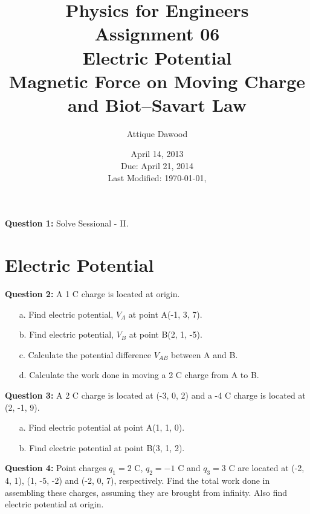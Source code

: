 \documentclass[12pt,a4paper]{article}
\title{\vspace{-3cm}Physics for Engineers\\Assignment 06\\Electric Potential\\ Magnetic Force on Moving Charge and Biot--Savart Law}
\author{Attique Dawood}
\date{April 14, 2013\\Due: April 21, 2014\\[0.2cm] Last Modified: \today, \currenttime}
\begin{document}
\maketitle
\noindent\textbf{Question 1:} Solve Sessional - II.
\section{Electric Potential}
\noindent\textbf{Question 2:} A 1 C charge is located at origin.
\begin{itemize}
\item[a.] Find electric potential, $V_A$ at point A(-1, 3, 7).
\item[b.] Find electric potential, $V_B$ at point B(2, 1, -5).
\item[c.] Calculate the potential difference $V_{AB}$ between A and B.
\item[d.] Calculate the work done in moving a 2 C charge from A to B.
\end{itemize}
\noindent\textbf{Question 3:} A 2 C charge is located at (-3, 0, 2) and a -4 C charge is located at (2, -1, 9).
\begin{itemize}
\item[a.] Find electric potential at point A(1, 1, 0).
\item[b.] Find electric potential at point B(3, 1, 2).
\end{itemize}
\noindent\textbf{Question 4:} Point charges $q_1=2$ C, $q_2=-1$ C and $q_3=3$ C are located at (-2, 4, 1), (1, -5, -2) and (-2, 0, 7), respectively. Find the total work done in assembling these charges, assuming they are brought from infinity. Also find electric potential at origin.\\[0.2cm]
\end{document}
